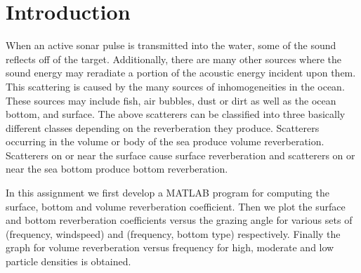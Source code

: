  \chapter{Introduction}  \label{Introduction}

\noindent When an active sonar pulse is transmitted into the water, some of the sound reflects off of
the target. Additionally, there are many other sources where the sound energy may reradiate a portion of the acoustic energy incident upon them. This scattering is caused by the many sources of inhomogeneities in the ocean. These sources may include fish,  air bubbles, dust or dirt as well as the ocean bottom, and surface. The above scatterers can be classified into three basically different classes depending on the reverberation they produce. Scatterers occurring in the volume or body of the sea produce volume reverberation. Scatterers on or near the surface cause surface reverberation and scatterers on or near the sea bottom produce bottom reverberation. 

\noindent In this assignment we first develop a MATLAB program for computing the surface, bottom and volume reverberation coefficient. Then we plot the surface and bottom reverberation coefficients versus the grazing angle for various sets of (frequency, windspeed) and (frequency, bottom type) respectively. Finally the graph for volume reverberation versus frequency for high, moderate and low particle densities is obtained.





